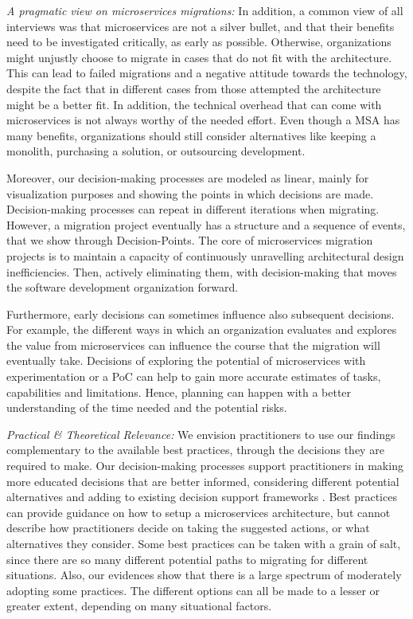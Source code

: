 \documentclass[sigconf,dvipsnames]{acmart}
\begin{document}
\emph{A pragmatic view on microservices migrations:} 
In addition, a common view of all interviews was that microservices are not a silver bullet, and that their benefits need to be investigated critically, as early as possible.
Otherwise, organizations might unjustly choose to migrate in cases that do not fit with the architecture.
This can lead to failed migrations and a negative attitude towards the technology, despite the fact that in different cases from those attempted the architecture might be a better fit. 
In addition, the technical overhead that can come with microservices is not always worthy of the needed effort. Even though a MSA has many benefits, organizations should still consider alternatives like keeping a monolith, purchasing a solution, or outsourcing development. 

Moreover, our decision-making processes are modeled as linear, mainly for visualization purposes and showing the points in which decisions are made. Decision-making processes can repeat in different iterations when migrating. 
However, a migration project eventually has a structure and a sequence of events, that we show through Decision-Points. 
The core of microservices migration projects is to maintain a capacity of continuously unravelling architectural design inefficiencies. Then, actively eliminating them, with decision-making that moves the software development organization forward. 

Furthermore, early decisions can sometimes influence also subsequent decisions.
For example, the different ways in which an organization evaluates and explores the value from microservices can influence the course that the migration will eventually take.
Decisions of exploring the potential of microservices with experimentation or a PoC can help to gain more accurate estimates of tasks, capabilities and limitations. Hence, planning can happen with a better understanding of the time needed and the potential risks.


\emph{Practical \& Theoretical Relevance:}
We envision practitioners to use our findings complementary to the available best practices, through the decisions they are required to make. 
Our decision-making processes support practitioners in making more educated decisions that are better informed, considering different potential alternatives and adding to existing decision support frameworks \cite{AUER2021106600}. Best practices can provide guidance on how to setup a microservices architecture, but cannot describe how practitioners decide on taking the suggested actions, or what alternatives they consider. 
Some best practices can be taken with a grain of salt, since there are so many different potential paths to migrating for different situations. 
Also, our evidences show that there is a large spectrum of moderately adopting some practices. The different options can all be made to a lesser or greater extent, depending on many situational factors. 
\end{document}
